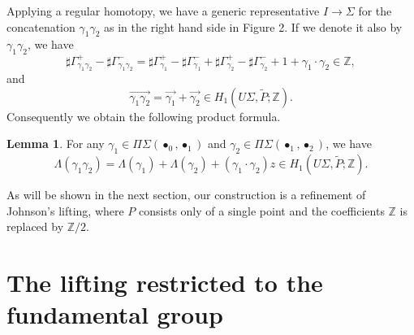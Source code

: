\documentclass[a4paper,12pt, twoside]{amsart}
\theoremstyle{definition}
\newtheorem{lem}[dfn]{Lemma}
\theoremstyle{remark}
\numberwithin{equation}{section}
\newcommand\bZ{{\mathbb{Z}}}
\newcommand\La{\Lambda}
\begin{document}
Applying a regular homotopy, we have a generic representative $I\to \Sigma$ for the concatenation $\gamma_1\gamma_2$ as in the right hand side in Figure 2. 
If we denote it also by $\gamma_1\gamma_2$, we have 
\begin{equation}\label{eq:shsum}
\sharp\Gamma^+_{\gamma_1\gamma_2} - 
\sharp\Gamma^-_{\gamma_1\gamma_2} 
= \sharp\Gamma^+_{\gamma_1} - 
\sharp\Gamma^-_{\gamma_1} 
+\sharp\Gamma^+_{\gamma_2} - 
\sharp\Gamma^-_{\gamma_2} +1
+\gamma_1\cdot \gamma_2\in \bZ,
\end{equation}
and 
\begin{equation}\label{eq:arsum}
\overrightarrow{\gamma_1\gamma_2}
= \overrightarrow{\gamma_1}
+ \overrightarrow{\gamma_2} \in H_1(U\Sigma, \tilde P; \bZ).
\end{equation}
Consequently we obtain the following product formula.
\begin{lem}\label{lem:product} For any $\gamma_1 \in \Pi\Sigma(\bullet_0, \bullet_1)$ and $\gamma_2 \in \Pi\Sigma(\bullet_1, \bullet_2)$, we have 
$$
\La(\gamma_1\gamma_2) = \La(\gamma_1)+\La(\gamma_2) + (\gamma_1\cdot\gamma_2)z \in H_1(U\Sigma, \tilde P; \bZ).
$$
\end{lem}
\par
As will be shown in the next section, our construction is a refinement of Johnson's lifting, 
where $P$ consists only of a single point and the coefficients $\bZ$ is replaced by $\bZ/2$.
\par

\section{The lifting restricted to the fundamental group}\label{sec:pilift}
\end{document}

